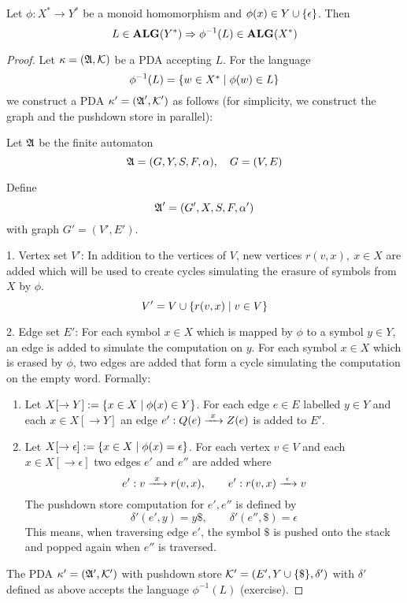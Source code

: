 \bigskip
\begin{theorem}
\label{alg-lang-closure-inv-hom}
Let $\phi : X^* \to Y^*$ be a monoid homomorphism and $\phi(x) \in Y \cup
\mbox{$\{\epsilon\}$}$. Then
\[ L \in \mbox{{\bf ALG}}(Y^*) \Rightarrow \phi^{-1}(L) \in \mbox{{\bf ALG}}(X^*) \]
\end{theorem}


\begin{proof}
Let $\kappa = (\mbox{$\mathfrak{A}$}, \mbox{$\mathcal{K}$})$ be a PDA accepting $L$. For the language
\[ \phi^{-1}(L) = \mbox{$\{w \in X^* \mid \phi(w) \in L\}$} \]
we construct a PDA $\kappa' = (\mbox{$\mathfrak{A}$}', \mbox{$\mathcal{K}$}')$ as follows (for
simplicity, we construct the graph and the pushdown store in parallel):

Let $\mbox{$\mathfrak{A}$}$ be the finite automaton
\[ \mbox{$\mathfrak{A}$} = (G, Y, S, F, \alpha),\quad G = (V, E) \]

Define
\[ \mbox{$\mathfrak{A}$}' = (G', X, S, F, \alpha') \]
with graph $G' = (V', E')$.

1. Vertex set $V'$: In addition to the vertices of $V$, new vertices $r(v, x),\
x \in X$ are added which will be used to create cycles simulating the erasure of
symbols from $X$ by $\phi$.
\[ V' = V \cup \mbox{$\{r(v,x) \mid v \in V\}$} \]

2. Edge set $E'$: For each symbol $x \in X$ which is mapped by $\phi$ to a 
symbol $y \in Y$, an edge is added to simulate the computation on $y$.
For each symbol $x \in X$ which is erased by $\phi$, two edges are added that
form a cycle simulating the computation on the empty word. Formally:

\begin{enumerate}
  \item Let $X[\to Y] := \mbox{$\{x \in X \mid \phi(x) \in Y\}$}$. For each edge
  $e \in E$ labelled $y \in Y$ and each $x \in X[\to Y]$ an edge $e': Q(e)
  \xrightarrow{\ {x}\ } Z(e)$ is added to $E'$.
  
  \item Let $X[\to \epsilon] := \mbox{$\{x \in X \mid \phi(x) = \epsilon\}$}$. For
  each vertex $v  \in V$ and each $x \in X[\to \epsilon]$ two edges $e'$ and
  $e''$ are added where
  \[ e': v \xrightarrow{\ {x}\ } r(v,x),\qquad e': r(v,x) \xrightarrow{\ {\epsilon}\ } v \]
  The pushdown store computation for $e', e''$ is defined by
  \[ \delta'(e', y) = y \$,\qquad \delta'(e'', \$) = \epsilon \]
  This means, when traversing edge $e'$, the symbol ${\$}$ is pushed onto the
  stack and popped again when $e''$ is traversed.
\end{enumerate}

The PDA $\kappa' = (\mbox{$\mathfrak{A'}$}, \mbox{$\mathcal{K'}$})$ with pushdown store
$\mbox{$\mathcal{K'}$} = (E', Y \cup \mbox{$\{\$\}$}, \delta')$ with $\delta'$ defined as
above accepts the language $\phi^{-1}(L)$ (exercise).
\end{proof}

